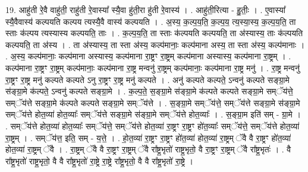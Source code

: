 \documentclass[17pt]{extarticle}
\begin{document}
19. आहु॑ती रे॒वै वाहु॑ती॒ राहु॑ती रे॒वास्या᳚ स्यै॒वा हु॑ती॒रा हु॑ती रे॒वास्य॑ । . आहु॑ती॒रित्या - हु॒तीः॒ । . ए॒वास्या᳚ स्यै॒वैवास्य॑ कल्पयति कल्पय त्यस्यै॒वै वास्य॑ कल्पयति । . अ॒स्य॒ क॒ल्प॒य॒ति॒ क॒ल्प॒य॒ त्य॒स्या॒स्य॒ क॒ल्प॒य॒ति॒ ता स्ताः क॑ल्पय त्यस्यास्य कल्पयति॒ ताः । . क॒ल्प॒य॒ति॒ ता स्ताः क॑ल्पयति कल्पयति॒ ता अ॑स्यास्य॒ ताः क॑ल्पयति कल्पयति॒ ता अ॑स्य । . ता अ॑स्यास्य॒ ता स्ता अ॑स्य॒ कल्प॑मानाः॒ कल्प॑माना अस्य॒ ता स्ता अ॑स्य॒ कल्प॑मानाः । . अ॒स्य॒ कल्प॑मानाः॒ कल्प॑माना अस्यास्य॒ कल्प॑माना रा॒ष्ट्रꣳ रा॒ष्ट्रम् कल्प॑माना अस्यास्य॒ कल्प॑माना रा॒ष्ट्रम् । . कल्प॑माना रा॒ष्ट्रꣳ रा॒ष्ट्रम् कल्प॑मानाः॒ कल्प॑माना रा॒ष्ट्र मन्वनु॑ रा॒ष्ट्रम् कल्प॑मानाः॒ कल्प॑माना रा॒ष्ट्र मनु॑ । . रा॒ष्ट्र मन्वनु॑ रा॒ष्ट्रꣳ रा॒ष्ट्र मनु॑ कल्पते कल्पते ऽनु रा॒ष्ट्रꣳ रा॒ष्ट्र मनु॑ कल्पते । . अनु॑ कल्पते कल्पते॒ ऽन्वनु॑ कल्पते सङ्ग्रा॒मे स॑ङ्ग्रा॒मे क॑ल्पते॒ ऽन्वनु॑ कल्पते सङ्ग्रा॒मे । . क॒ल्प॒ते॒ स॒ङ्ग्रा॒मे स॑ङ्ग्रा॒मे क॑ल्पते कल्पते सङ्ग्रा॒मे सम्ॅय॑त्ते॒ सम्ॅय॑त्ते सङ्ग्रा॒मे क॑ल्पते कल्पते सङ्ग्रा॒मे सम्ॅय॑त्ते । . स॒ङ्ग्रा॒मे सम्ॅय॑त्ते॒ सम्ॅय॑त्ते सङ्ग्रा॒मे स॑ङ्ग्रा॒मे सम्ॅय॑त्ते होत॒व्या॑ होत॒व्याः᳚ सम्ॅय॑त्ते सङ्ग्रा॒मे स॑ङ्ग्रा॒मे सम्ॅय॑त्ते होत॒व्याः᳚ । . स॒ङ्ग्रा॒म इति॑ सम् - ग्रा॒मे । . सम्ॅय॑त्ते होत॒व्या॑ होत॒व्याः᳚ सम्ॅय॑त्ते॒ सम्ॅय॑त्ते होत॒व्या॑ रा॒ष्ट्रꣳ रा॒ष्ट्रꣳ हो॑त॒व्याः᳚ सम्ॅय॑त्ते॒ सम्ॅय॑त्ते होत॒व्या॑ रा॒ष्ट्रम् । . सम्ॅय॑त्त॒ इति॒ सम् - य॒त्ते॒ । . हो॒त॒व्या॑ रा॒ष्ट्रꣳ रा॒ष्ट्रꣳ हो॑त॒व्या॑ होत॒व्या॑ रा॒ष्ट्रम् ॅवै वै रा॒ष्ट्रꣳ हो॑त॒व्या॑ होत॒व्या॑ रा॒ष्ट्रम् ॅवै । . रा॒ष्ट्रम् ॅवै वै रा॒ष्ट्रꣳ रा॒ष्ट्रम् ॅवै रा᳚ष्ट्र॒भृतो॑ राष्ट्र॒भृतो॒ वै रा॒ष्ट्रꣳ रा॒ष्ट्रम् ॅवै रा᳚ष्ट्र॒भृतः॑ । . वै रा᳚ष्ट्र॒भृतो॑ राष्ट्र॒भृतो॒ वै वै रा᳚ष्ट्र॒भृतो॑ रा॒ष्ट्रे रा॒ष्ट्रे रा᳚ष्ट्र॒भृतो॒ वै वै 
रा᳚ष्ट्र॒भृतो॑ रा॒ष्ट्रे । \newline
\end{document}
